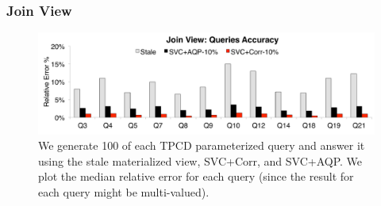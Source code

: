 \subsubsection{Join View}



\begin{figure}[t]\vspace{-2em}
\centering
\includegraphics[scale=0.13]{exp/msj_3.pdf}\vspace{-.5em}
 \caption{We generate 100 of each TPCD parameterized query and answer it using the stale materialized view, SVC+Corr, and SVC+AQP. We plot the median relative error for each query (since the result for each query might be multi-valued).\label{exp-1-acc}}
\end{figure}

